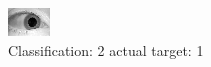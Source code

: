 \begin{figure}[h!]
\begin{center}
\includegraphics[width=0.60\columnwidth]{figures/ID1509_class_2_target_1.png}
\end{center}
\caption{ Classification: 2 actual target: 1}
\label{fig:ID1509_class_2_target_1}
\end{figure}
